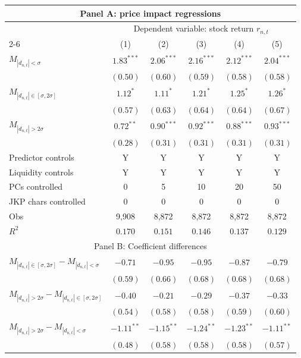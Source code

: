 \begin{tabular}{lccccc}
  \hline \multicolumn{6}{c}{Panel A: price impact regressions} \\
 \hline
                                    & \multicolumn{5}{c}{Dependent variable: stock return $r_{n,t}$} \\

                                    \cmidrule(l){2-6}  
  & (1) & (2) & (3) & (4) & (5) \\ 
  $M_{|d_{n,t}| < \sigma}$ & $1.83^{***}$ & $2.06^{***}$ & $2.16^{***}$ & $2.12^{***}$ & $2.04^{***}$ \\ 
   & $(0.50)$ & $(0.60)$ & $(0.59)$ & $(0.58)$ & $(0.58)$ \\ 
  $M_{|d_{n,t}| \in [\sigma, 2\sigma]}$ & $1.12^{*}$ & $1.11^{*}$ & $1.21^{*}$ & $1.25^{*}$ & $1.26^{*}$ \\ 
   & $(0.57)$ & $(0.63)$ & $(0.64)$ & $(0.64)$ & $(0.67)$ \\ 
  $M_{|d_{n,t}| > 2 \sigma}$ & $0.72^{**}$ & $0.90^{***}$ & $0.92^{***}$ & $0.88^{***}$ & $0.93^{***}$ \\ 
   & $(0.28)$ & $(0.31)$ & $(0.31)$ & $(0.31)$ & $(0.31)$ \\ 
  Predictor controls & Y & Y & Y & Y & Y \\ 
   \vspace{5pt}Liquidity controls & Y & Y & Y & Y & Y \\ 
  PCs controlled & 0 & 5 & 10 & 20 & 50 \\ 
   \vspace{5pt}JKP chars controlled & 0 & 0 & 0 & 0 & 0 \\ 
  Obs & 9,908 & 8,872 & 8,872 & 8,872 & 8,872 \\ 
   \vspace{5pt}$R^2$ & $0.170$ & $0.151$ & $0.146$ & $0.137$ & $0.129$ \\ 
   \hline \multicolumn{6}{c}{Panel B: Coefficient differences} \\
 \hline$M_{|d_{n,t}| \in [\sigma, 2\sigma]} - M_{|d_{n,t}| < \sigma}$ & $-0.71$ & $-0.95$ & $-0.95$ & $-0.87$ & $-0.79$ \\ 
   & $(0.59)$ & $(0.66)$ & $(0.68)$ & $(0.68)$ & $(0.68)$ \\ 
  $M_{|d_{n,t}| > 2 \sigma} - M_{|d_{n,t}| \in [\sigma, 2\sigma]}$ & $-0.40$ & $-0.21$ & $-0.29$ & $-0.37$ & $-0.33$ \\ 
   & $(0.54)$ & $(0.58)$ & $(0.58)$ & $(0.59)$ & $(0.60)$ \\ 
  $M_{|d_{n,t}| > 2 \sigma} - M_{|d_{n,t}| < \sigma}$ & $-1.11^{**}$ & $-1.15^{**}$ & $-1.24^{**}$ & $-1.23^{**}$ & $-1.11^{**}$ \\ 
   & $(0.48)$ & $(0.58)$ & $(0.58)$ & $(0.58)$ & $(0.57)$ \\ 
   \hline 
\end{tabular}
